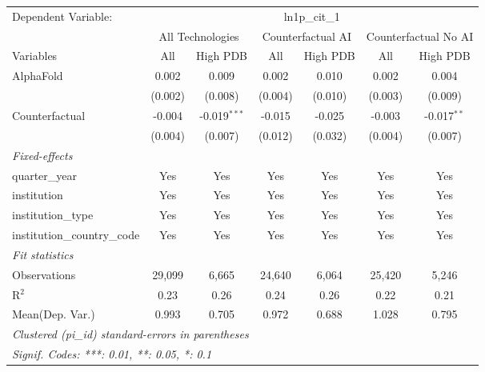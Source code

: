 \begingroup
\centering
\begin{tabular}{lcccccc}
   \tabularnewline \midrule \midrule
   Dependent Variable: & \multicolumn{6}{c}{ln1p\_cit\_1}\\
 & \multicolumn{2}{c}{All Technologies} & \multicolumn{2}{c}{Counterfactual AI} & \multicolumn{2}{c}{Counterfactual No AI} \\
\cmidrule(lr){1-1}\cmidrule(lr){2-3} \cmidrule(lr){4-5} \cmidrule(lr){6-7}
Variables & \multicolumn{1}{c}{All} & \multicolumn{1}{c}{High PDB} & \multicolumn{1}{c}{All} & \multicolumn{1}{c}{High PDB} & \multicolumn{1}{c}{All} & \multicolumn{1}{c}{High PDB} \\
\cmidrule(lr){1-1}\cmidrule(lr){2-2} \cmidrule(lr){3-3} \cmidrule(lr){4-4} \cmidrule(lr){5-5} \cmidrule(lr){6-6} \cmidrule(lr){7-7}
   AlphaFold                    & 0.002   & 0.009          & 0.002   & 0.010   & 0.002   & 0.004\\   
                                & (0.002) & (0.008)        & (0.004) & (0.010) & (0.003) & (0.009)\\   
   Counterfactual               & -0.004  & -0.019$^{***}$ & -0.015  & -0.025  & -0.003  & -0.017$^{**}$\\   
                                & (0.004) & (0.007)        & (0.012) & (0.032) & (0.004) & (0.007)\\   
   \midrule
   \emph{Fixed-effects}\\
   quarter\_year                & Yes     & Yes            & Yes     & Yes     & Yes     & Yes\\  
   institution                  & Yes     & Yes            & Yes     & Yes     & Yes     & Yes\\  
   institution\_type            & Yes     & Yes            & Yes     & Yes     & Yes     & Yes\\  
   institution\_country\_code   & Yes     & Yes            & Yes     & Yes     & Yes     & Yes\\  
   \midrule
   \emph{Fit statistics}\\
   Observations                 & 29,099  & 6,665          & 24,640  & 6,064   & 25,420  & 5,246\\  
   R$^2$                        & 0.23    & 0.26           & 0.24    & 0.26    & 0.22    & 0.21\\  
Mean(Dep. Var.) & 0.993 & 0.705 & 0.972 & 0.688 & 1.028 & 0.795 \\
   \midrule \midrule
   \multicolumn{7}{l}{\emph{Clustered (pi\_id) standard-errors in parentheses}}\\
   \multicolumn{7}{l}{\emph{Signif. Codes: ***: 0.01, **: 0.05, *: 0.1}}\\
\end{tabular}
\par\endgroup
